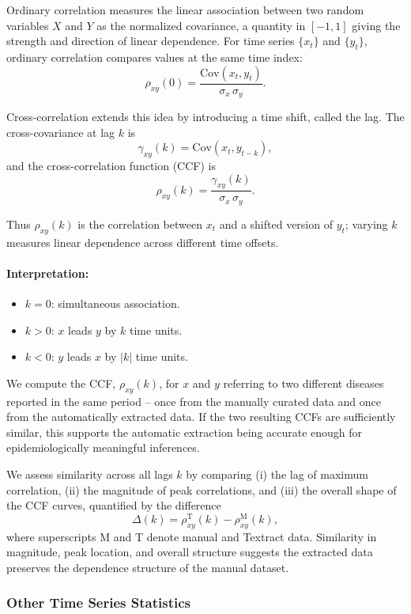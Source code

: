 \documentclass[12pt]{article}
\begin{document}
Ordinary correlation measures the linear association between two random variables $X$ and $Y$ as the normalized covariance, a quantity in $[-1,1]$ giving the strength and direction of linear dependence. For time series $\{x_t\}$ and $\{y_t\}$, ordinary correlation compares values at the same time index:
\[
\rho_{xy}(0) = 
\frac{\mathrm{Cov}(x_t, y_t)}{\sigma_x \, \sigma_y}.
\]

Cross-correlation extends this idea by introducing a time shift, called the lag. The cross-covariance at lag $k$ is
\[
\gamma_{xy}(k) = \mathrm{Cov}(x_t, y_{t-k}),
\]
and the cross-correlation function (CCF) is
\[
\rho_{xy}(k) = 
\frac{\gamma_{xy}(k)}{\sigma_x \, \sigma_y}.
\]

Thus $\rho_{xy}(k)$ is the correlation between $x_t$ and a shifted version of $y_t$; varying $k$ measures linear dependence across different time offsets.

\paragraph{Interpretation:}
\begin{itemize}
    \item $k = 0$: simultaneous association.
    \item $k > 0$: $x$ leads $y$ by $k$ time units.
    \item $k < 0$: $y$ leads $x$ by $|k|$ time units.
\end{itemize}



We compute the CCF, $\rho_{xy}(k)$, for $x$ and $y$ referring to two different diseases reported in the same period -- once from the manually curated data and once from the automatically extracted data. If the two resulting CCFs are sufficiently similar, this supports the automatic extraction being accurate enough for epidemiologically meaningful inferences.

We assess similarity across all lags $k$ by comparing (i) the lag of maximum correlation, (ii) the magnitude of peak correlations, and (iii) the overall shape of the CCF curves, quantified by the difference
\[
\Delta(k) = \rho_{xy}^{\mathrm{T}}(k) - \rho_{xy}^{\mathrm{M}}(k),
\]
where superscripts M and T denote manual and Textract data. Similarity in magnitude, peak location, and overall structure suggests the extracted data preserves the dependence structure of the manual dataset.


\subsubsection{Other Time Series Statistics}
\end{document}
